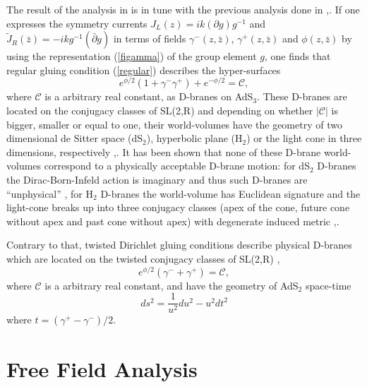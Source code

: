 \documentclass[a4paper,12pt]{article}
\begin{document}
The result of the analysis in \cite{lomholt} is in tune with the previous
analysis done in \cite{stanciu},\cite{bachas}. If one expresses the symmetry
currents $J_{L}\left( z\right) =ik\left( \partial g\right) g^{-1}$ and $%
\tilde{J}_{R}\left( \bar{z}\right) =-ikg^{-1}\left( \bar{\partial}g\right) $
in terms of fields $\gamma ^{-}\left( z,\bar{z}\right) $, $\gamma ^{+}\left(
z,\bar{z}\right) $ and $\phi \left( z,\bar{z}\right) $ by using the
representation (\ref{figamma}) of the group element $g$, one finds that
regular gluing condition (\ref{regular}) describes the hyper-surfaces
\begin{equation}
e^{\phi /2}\left( 1+\gamma ^{-}\gamma ^{+}\right) +e^{-\phi /2}=\mathcal{C},
\label{regularD}
\end{equation}
where $\mathcal{C}$ is a arbitrary real constant, as D-branes on AdS$_{3}$.
These D-branes are located on the conjugacy classes of SL(2,R) and depending
on whether $\left| \mathcal{C}\right| $ is bigger, smaller or equal to one,
their world-volumes have the geometry of two dimensional de Sitter space (dS$%
_{2}$), hyperbolic plane (H$_{2}$) or the light cone in three dimensions,
respectively \cite{stanciu},\cite{bachas}. It has been shown that none of
these D-brane world-volumes correspond to a physically acceptable D-brane
motion: for dS$_{2}$ D-branes the Dirac-Born-Infeld action is imaginary and
thus such D-branes are ``unphysical'' \cite{bachas}, for H$_{2}$ D-branes
the world-volume has Euclidean signature and the light-cone breaks up into
three conjugacy classes (apex of the cone, future cone without apex and past
cone without apex) with degenerate induced metric \cite{stanciu},\cite
{bachas}.

Contrary to that, twisted Dirichlet gluing conditions describe physical
D-branes \cite{bachas} which are located on the twisted conjugacy classes of
SL(2,R) \cite{bachas},\cite{lomholt}
\begin{equation}
e^{\phi /2}\left( \gamma ^{-}+\gamma ^{+}\right) =\mathcal{C},
\label{twistedD}
\end{equation}
where $\mathcal{C}$ is a arbitrary real constant, and have the geometry of
AdS$_{2}$ space-time
\begin{equation}
ds^{2}=\frac{1}{u^{2}}du^{2}-u^{2}dt^{2}  \label{ads2}
\end{equation}
where $t=(\gamma ^{+}-\gamma ^{-})/2$.

\section{Free Field Analysis}
\end{document}
